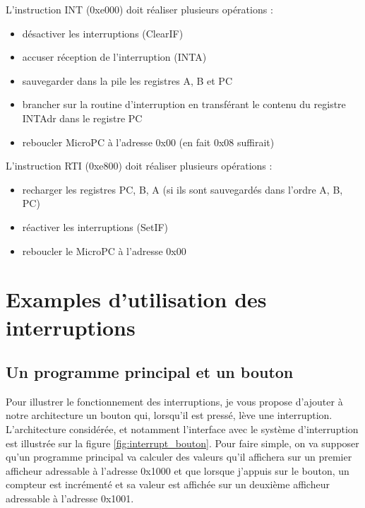 L'instruction INT (0xe000) doit réaliser plusieurs opérations :
\begin{itemize}
\item désactiver les interruptions (ClearIF)
\item accuser réception de l'interruption (INTA)
\item sauvegarder dans la pile les registres A, B et PC
\item brancher sur la routine d'interruption en transférant le contenu du registre INTAdr dans le registre PC
\item reboucler MicroPC à l'adresse 0x00  (en fait 0x08 suffirait)
\end{itemize}

L'instruction RTI (0xe800) doit réaliser plusieurs opérations :
\begin{itemize}
\item recharger les registres PC, B, A (si ils sont sauvegardés dans l'ordre A, B, PC)
\item réactiver les interruptions (SetIF)
\item reboucler le MicroPC à l'adresse 0x00
\end{itemize}




\section{Examples d'utilisation des interruptions}

\subsection{Un programme principal et un bouton}

Pour illustrer le fonctionnement des interruptions, je vous propose d'ajouter à notre architecture un bouton qui, lorsqu'il est pressé, lève une interruption. L'architecture considérée, et notamment l'interface avec le système d'interruption est illustrée sur la figure \ref{fig:interrupt_bouton}. Pour faire simple, on va supposer qu'un programme principal va calculer des valeurs qu'il affichera sur un premier afficheur adressable à l'adresse 0x1000 et que lorsque j'appuis sur le bouton, un compteur est incrémenté et sa valeur est affichée sur un deuxième afficheur adressable à l'adresse 0x1001.

